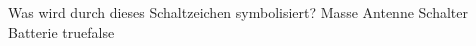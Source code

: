     {Was wird durch dieses Schaltzeichen symbolisiert?}
    {Masse}
    {Antenne}
    {Schalter}
    {Batterie}
    {true}{false}